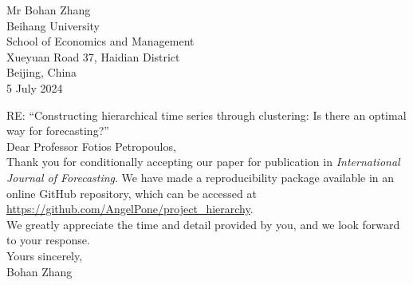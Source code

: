 \documentclass[a4paper,12pt]{amsart}
\begin{document}
\begin{flushright}
Mr Bohan Zhang\\
Beihang University\\
School of Economics and Management\\%
Xueyuan Road 37, Haidian District \\
Beijing, China\\
5 July 2024
\end{flushright}

\bigskip
RE: ``Constructing hierarchical time series through clustering: Is there an optimal way for forecasting?''   \\


Dear Professor Fotios Petropoulos,\\

Thank you for conditionally accepting our paper for publication in \textit{International Journal of Forecasting}. We have made a reproducibility package available in an online GitHub repository, which can be accessed at \url{https://github.com/AngelPone/project_hierarchy}.    \\

We greatly appreciate the time and detail provided by you, and we look forward to your response.\\

Yours sincerely,\\
Bohan Zhang
\end{document}
